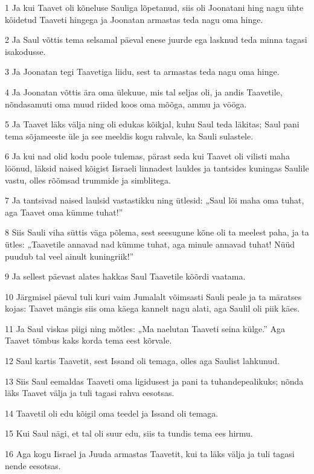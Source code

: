 \par 1 Ja kui Taavet oli kõneluse Sauliga lõpetanud, siis oli Joonatani hing nagu ühte köidetud Taaveti hingega ja Joonatan armastas teda nagu oma hinge.
\par 2 Ja Saul võttis tema selsamal päeval enese juurde ega lasknud teda minna tagasi isakodusse.
\par 3 Ja Joonatan tegi Taavetiga liidu, sest ta armastas teda nagu oma hinge.
\par 4 Ja Joonatan võttis ära oma ülekuue, mis tal seljas oli, ja andis Taavetile, nõndasamuti oma muud riided koos oma mõõga, ammu ja vööga.
\par 5 Ja Taavet läks välja ning oli edukas kõikjal, kuhu Saul teda läkitas; Saul pani tema sõjameeste üle ja see meeldis kogu rahvale, ka Sauli sulastele.
\par 6 Ja kui nad olid kodu poole tulemas, pärast seda kui Taavet oli vilisti maha löönud, läksid naised kõigist Iisraeli linnadest lauldes ja tantsides kuningas Saulile vastu, olles rõõmsad trummide ja simblitega.
\par 7 Ja tantsivad naised laulsid vastastikku ning ütlesid: „Saul lõi maha oma tuhat, aga Taavet oma kümme tuhat!”
\par 8 Siis Sauli viha süttis väga põlema, sest seesugune kõne oli ta meelest paha, ja ta ütles: „Taavetile annavad nad kümme tuhat, aga minule annavad tuhat! Nüüd puudub tal veel ainult kuningriik!”
\par 9 Ja sellest päevast alates hakkas Saul Taavetile kõõrdi vaatama.
\par 10 Järgmisel päeval tuli kuri vaim Jumalalt võimsasti Sauli peale ja ta märatses kojas: Taavet mängis siis oma käega kannelt nagu alati, aga Saulil oli piik käes.
\par 11 Ja Saul viskas piigi ning mõtles: „Ma naelutan Taaveti seina külge.” Aga Taavet tõmbus kaks korda tema eest kõrvale.
\par 12 Saul kartis Taavetit, sest Issand oli temaga, olles aga Saulist lahkunud.
\par 13 Siis Saul eemaldas Taaveti oma ligidusest ja pani ta tuhandepealikuks; nõnda läks Taavet välja ja tuli tagasi rahva eesotsas.
\par 14 Taavetil oli edu kõigil oma teedel ja Issand oli temaga.
\par 15 Kui Saul nägi, et tal oli suur edu, siis ta tundis tema ees hirmu.
\par 16 Aga kogu Iisrael ja Juuda armastas Taavetit, kui ta läks välja ja tuli tagasi nende eesotsas.

